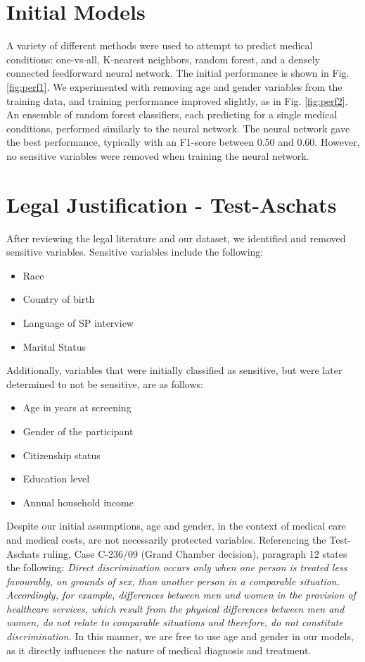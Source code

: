 \documentclass[runningheads]{llncs}
\begin{document}
\section{Initial Models}
A variety of different methods were used to attempt to predict medical conditions: one-vs-all, K-nearest neighbors, random forest, and a densely connected feedforward neural network. The initial performance is shown in Fig. \ref{fig:perf1}. We experimented with removing age and gender variables from the training data, and training performance improved slightly, as in Fig. \ref{fig:perf2}. An ensemble of random forest classifiers, each predicting for a single medical conditions, performed similarly to the neural network. The neural network gave the best performance, typically with an F1-score between 0.50 and 0.60. However, no sensitive variables were removed when training the neural network.

\section{Legal Justification - Test-Aschats}

After reviewing the legal literature and our dataset, we identified and removed sensitive variables. Sensitive variables include the following:
\begin{itemize}
\item Race
\item Country of birth
\item Language of SP interview
\item Marital Status
\end{itemize}

Additionally, variables that were initially classified as sensitive, but were later determined to not be sensitive, are as follows:
\begin{itemize}
\item Age in years at screening
\item Gender of the participant
\item Citizenship status
\item Education level
\item Annual household income
\end{itemize}

Despite our initial assumptions, age and gender, in the context of medical care and medical costs, are not necessarily protected variables. Referencing the Test-Aschats ruling, Case C-236/09 (Grand Chamber decision), paragraph 12 states the following: \textit{Direct discrimination occurs only when one person is treated less favourably, on grounds of sex, than another person in a comparable situation. Accordingly, for example, differences between men and women in the provision of healthcare services, which result from the physical differences between men and women, do not relate to comparable situations and therefore, do not constitute discrimination.} In this manner, we are free to use age and gender in our models, as it directly influences the nature of medical diagnosis and treatment. 
\end{document}
